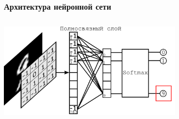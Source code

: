 \begin{frame}
\frametitle{Архитектура нейронной сети}
\begin{columns}[T]
    
    \begin{block}{}%
        \vspace{1mm}
        \centering \includegraphics[width = 0.7\textwidth]{pics/nn.png}
    \end{block}        

    \vspace{-2mm}
        
\end{columns}
\end{frame}
